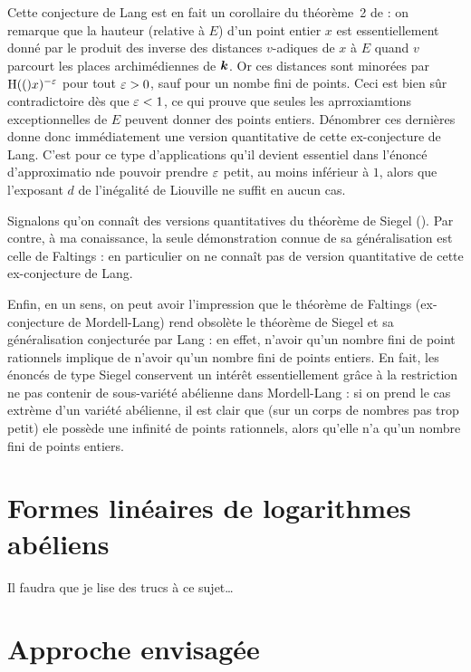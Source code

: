 \documentclass[a4paper, 11pt]{article}
\renewcommand*\bsc{}
\begin{document}
Cette conjecture de \bsc{Lang} est en fait un corollaire du théorème~2 de
\cite{falda} : on remarque que la hauteur (relative à $E$) d'un point
entier $x$ est essentiellement donné par le produit des inverse des distances
$v$-adiques de $x$ à $E$ quand $v$ parcourt les places archimédiennes de
$\boldsymbol{k}$. Or ces distances sont minorées par $\operatorname{H}(()x)^{-\varepsilon}$ pour tout
$\varepsilon>0$, sauf pour un nombe fini de points. Ceci est bien sûr contradictoire
dès que $\varepsilon < 1$, ce qui prouve que seules les aprroxiamtions
exceptionnelles de $E$ peuvent donner des points entiers. Dénombrer ces
dernières donne donc immédiatement une version quantitative de cette
ex-conjecture de \bsc{Lang}. C'est pour ce type d'applications qu'il devient
essentiel dans l'énoncé d'approximatio nde pouvoir prendre $\varepsilon$ petit, au
moins inférieur à $1$, alors que l'exposant $d$ de l'inégalité de
\bsc{Liouville} ne suffit en aucun cas.

Signalons qu'on connaît des versions quantitatives du théorème de \bsc{Siegel}
(\cite{XXX}). Par contre, à ma conaissance, la seule démonstration connue de
sa généralisation est celle de \bsc{Faltings} : en particulier on ne connaît
pas de version quantitative de cette ex-conjecture de \bsc{Lang}.

Enfin, en un sens, on peut avoir l'impression que le théorème de
\bsc{Faltings} (ex-conjecture de \bsc{Mordell-Lang}) rend obsolète le théorème
de \bsc{Siegel} et sa généralisation conjecturée par \bsc{Lang} : en effet,
n'avoir qu'un nombre fini de point rationnels implique de n'avoir qu'un
nombre fini de points entiers. En fait, les énoncés de type \bsc{Siegel}
conservent un intérêt essentiellement grâce à la restriction \og ne pas
contenir de sous-variété abélienne \fg dans \bsc{Mordell-Lang} : si on prend
le cas extrème d'un variété abélienne, il est clair que (sur un corps de
nombres pas trop petit) ele possède une infinité de points rationnels, alors
qu'elle n'a qu'un nombre fini de points entiers. 

\section{Formes linéaires de logarithmes abéliens}

Il faudra que je lise des trucs à ce sujet\dots

\section{Approche envisagée}\label{s-approche}
\end{document}
